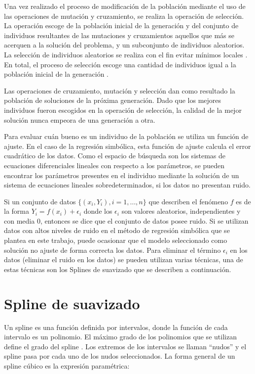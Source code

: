 Una vez realizado el proceso de modificación de la población mediante el uso de las operaciones de mutación y cruzamiento, se realiza la operación de selección. La operación escoge de la población inicial de la generación y del conjunto de individuos resultantes de las mutaciones y cruzamientos aquellos que más se acerquen a la solución del problema, y un subconjunto de individuos aleatorios. La selección de individuos aleatorios se realiza con el fin evitar mínimos locales \cite{mitchell1998introduction}. En total, el proceso de selección escoge una cantidad de individuos igual a la población inicial de la generación \cite{mitchell1998introduction}.

Las operaciones de cruzamiento, mutación y selección dan como resultado la población de soluciones de la próxima generación. Dado que los mejores individuos fueron escogidos en la operación de selección, la calidad de la mejor solución nunca empeora de una generación a otra.

Para evaluar cuán bueno es un individuo de la población se utiliza un función de ajuste. En el caso de la regresión simbólica, esta función de ajuste calcula el error cuadrático de los datos. Como el espacio de búsqueda son los sistemas de ecuaciones diferenciales lineales con respecto a los parámetros, se pueden encontrar los parámetros presentes en el individuo mediante la solución de un sistema de ecuaciones lineales sobredeterminados, si los datos no presentan ruido.

Si un conjunto de datos $\{(x_i, Y_i), i=1, \dots, n\}$ que describen el fenómeno $f$ es de la forma $Y_i = f(x_i) + \epsilon _i$ donde los $\epsilon _i$ son valores aleatorios, independientes y con media 0, entonces se dice que el conjunto de datos posee ruido. Si se utilizan datos con altos niveles de ruido en el método de regresión simbólica que se plantea en este trabajo, puede ocasionar que el modelo seleccionado como solución no ajuste de forma correcta los datos. Para eliminar el término $\epsilon _i$ en los datos (eliminar el ruido en los datos) se pueden utilizan varias técnicas, una de estas técnicas son los Splines de suavizado que se describen a continuación.

\section{Spline de suavizado}\label{section:smoothing_splines}

Un spline es una función definida por intervalos, donde la función de cada intervalo es un polinomio. El máximo grado de los polinomios que se utilizan define el grado del spline \cite{ahlberg1967theory}. Los extremos de los intervalos se llaman ``nudos'' y el spline pasa por cada uno de los nudos seleccionados. La forma general de un spline cúbico es la expresión paramétrica:

